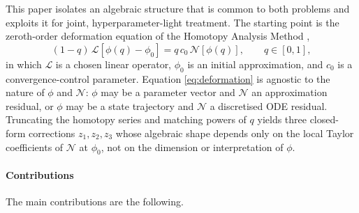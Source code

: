 \documentclass[preprint,12pt,numbers]{elsarticle}
\begin{document}
This paper isolates an algebraic structure that is common to both problems
and exploits it for joint, hyperparameter-light treatment. The starting
point is the zeroth-order deformation equation of the Homotopy Analysis
Method \cite{Liao2003,Liao2012,Liao2010},
\begin{equation}
(1-q)\,\mathcal{L}\!\left[\phi(q) - \phi_0\right] = q\,c_0\,\mathcal{N}[\phi(q)],
\qquad q \in [0,1],
\label{eq:deformation}
\end{equation}
in which $\mathcal{L}$ is a chosen linear operator, $\phi_0$ is an initial
approximation, and $c_0$ is a convergence-control parameter. Equation
\eqref{eq:deformation} is agnostic to the nature of $\phi$ and $\mathcal{N}$:
$\phi$ may be a parameter vector and $\mathcal{N}$ an approximation
residual, or $\phi$ may be a state trajectory and $\mathcal{N}$ a discretised
ODE residual. Truncating the homotopy series and matching powers of $q$
yields three closed-form corrections $z_1, z_2, z_3$ whose algebraic shape
depends only on the local Taylor coefficients of $\mathcal{N}$ at $\phi_0$,
not on the dimension or interpretation of $\phi$.

\paragraph{Contributions} The main contributions are the following.
\end{document}
